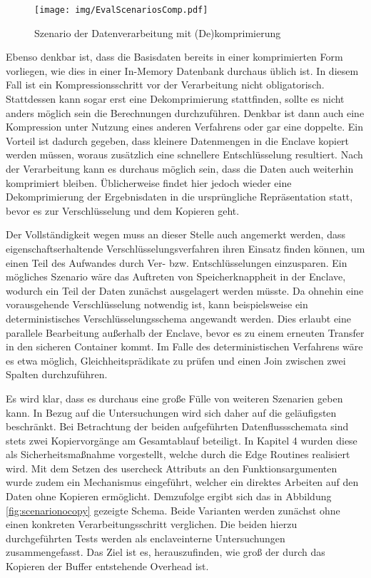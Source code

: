 \begin{figure}[h]
	\texttt{[image: img/EvalScenariosComp.pdf]}
	\centering
	\caption{Szenario der Datenverarbeitung mit (De)komprimierung}
	\label{fig:scenariocomp}
\end{figure}

Ebenso denkbar ist, dass die Basisdaten bereits in einer komprimierten Form vorliegen, wie dies in einer In-Memory Datenbank durchaus üblich ist. In diesem Fall ist ein Kompressionsschritt vor der Verarbeitung nicht obligatorisch. Stattdessen kann sogar erst eine Dekomprimierung stattfinden, sollte es nicht anders möglich sein die Berechnungen durchzuführen. Denkbar ist dann auch eine Kompression unter Nutzung eines anderen Verfahrens oder gar eine doppelte. Ein Vorteil ist dadurch gegeben, dass kleinere Datenmengen in die Enclave kopiert werden müssen, woraus zusätzlich eine schnellere Entschlüsselung resultiert. Nach der Verarbeitung kann es durchaus möglich sein, dass die Daten auch weiterhin komprimiert bleiben. Üblicherweise findet hier jedoch wieder eine Dekomprimierung der Ergebnisdaten in die ursprüngliche Repräsentation statt, bevor es zur Verschlüsselung und dem Kopieren geht.

Der Vollständigkeit wegen muss an dieser Stelle auch angemerkt werden, dass eigenschaftserhaltende Verschlüsselungsverfahren ihren Einsatz finden können, um einen Teil des Aufwandes durch Ver- bzw. Entschlüsselungen einzusparen. Ein mögliches Szenario wäre das Auftreten von Speicherknappheit in der Enclave, wodurch ein Teil der Daten zunächst ausgelagert werden müsste. Da ohnehin eine vorausgehende Verschlüsselung notwendig ist, kann beispielsweise ein deterministisches Verschlüsselungsschema angewandt werden. Dies erlaubt eine parallele Bearbeitung außerhalb der Enclave, bevor es zu einem erneuten Transfer in den sicheren Container kommt. Im Falle des deterministischen Verfahrens wäre es etwa möglich, Gleichheitsprädikate zu prüfen und einen Join zwischen zwei Spalten durchzuführen.

Es wird klar, dass es durchaus eine große Fülle von weiteren Szenarien geben kann. In Bezug auf die Untersuchungen wird sich daher auf die geläufigsten beschränkt. Bei Betrachtung der beiden aufgeführten Datenflussschemata sind stets zwei Kopiervorgänge am Gesamtablauf beteiligt. In Kapitel 4 wurden diese als Sicherheitsmaßnahme vorgestellt, welche durch die Edge Routines realisiert wird. Mit dem Setzen des user\textunderscore check Attributs an den Funktionsargumenten wurde zudem ein Mechanismus eingeführt, welcher ein direktes Arbeiten auf den Daten ohne Kopieren ermöglicht. Demzufolge ergibt sich das in Abbildung \ref{fig:scenarionocopy} gezeigte Schema. Beide Varianten werden zunächst ohne einen konkreten Verarbeitungsschritt verglichen. Die beiden hierzu durchgeführten Tests werden als enclaveinterne Untersuchungen zusammengefasst. Das Ziel ist es, herauszufinden, wie groß der durch das Kopieren der Buffer entstehende Overhead ist.

